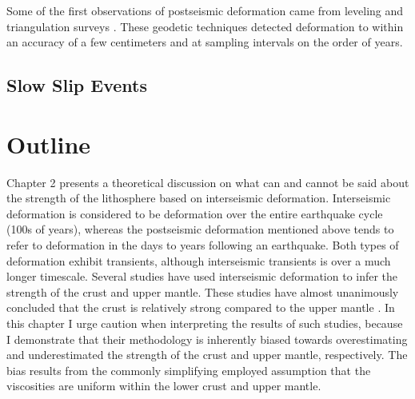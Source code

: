 Some of the first observations of postseismic deformation came from
leveling and triangulation surveys \citep[e.g,][]{Kanamori1973,
Thatcher1975}. These geodetic techniques detected deformation to
within an accuracy of a few centimeters and at sampling intervals on
the order of years. 

\subsection{Slow Slip Events}

\section{Outline}
Chapter 2 presents a theoretical discussion on what can and cannot be
said about the strength of the lithosphere based on interseismic
deformation. Interseismic deformation is considered to be deformation
over the entire earthquake cycle (100s of years), whereas the
postseismic deformation mentioned above tends to refer to deformation
in the days to years following an earthquake. Both types of
deformation exhibit transients, although interseismic transients is
over a much longer timescale. Several studies have used interseismic
deformation to infer the strength of the crust and upper mantle. These
studies have almost unanimously concluded that the crust is relatively
strong compared to the upper mantle \citep{Thatcher2008}. In this
chapter I urge caution when interpreting the results of such studies,
because I demonstrate that their methodology is inherently biased
towards overestimating and underestimated the strength of the crust
and upper mantle, respectively. The bias results from the commonly
simplifying employed assumption that the viscosities are uniform
within the lower crust and upper mantle.

